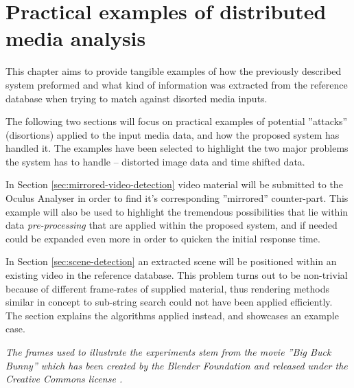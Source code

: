 \chapter{Practical examples of distributed media analysis}
\label{chap:analysis-examples}

This chapter aims to provide tangible examples of how the previously described system preformed and what kind of information was extracted from the reference database when trying to match against disorted media inputs.

The following two sections will focus on practical examples of potential ''attacks'' (disortions) applied to the input media data, and how the proposed system has handled it. The examples have been selected to highlight the two major problems the system has to handle -- distorted image data and time shifted data.

In Section \ref{sec:mirrored-video-detection} video material will be submitted to the Oculus Analyser in order to find it's corresponding ''mirrored'' counter-part. This example will also be used to highlight the tremendous possibilities that lie within data \textit{pre-processing} that are applied within the proposed system, and if needed could be expanded even more in order to quicken the initial response time.

In Section \ref{sec:scene-detection} an extracted scene will be positioned within an existing video in the reference database. This problem turns out to be non-trivial because of different frame-rates of supplied material, thus rendering methods similar in concept to sub-string search could not have been applied efficiently. The section explains the algorithms applied instead, and showcases an example case.


\textit{The frames used to illustrate the experiments stem from the movie ''\textit{Big Buck Bunny}'' \cite{big-buck-bunny} which has been created by the Blender Foundation \cite{blender-foundation} and released under the Creative Commons license \cite{creative-commons}.}

